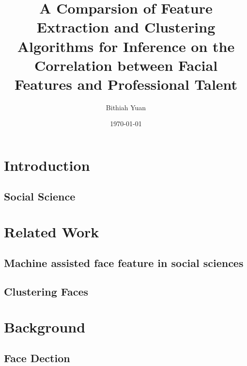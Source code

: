 \documentclass[12pt,english]{article}
\title{A Comparsion of Feature Extraction and Clustering Algorithms for Inference on the Correlation between Facial Features and Professional Talent}
\author{Bithiah Yuan}
\date{\today}
\begin{document}
\maketitle




\section{Introduction}
\label{sec:introduction}

\subsection{Social Science}

\quad %



\section{Related Work}


\subsection{Machine assisted face feature in social sciences}


\subsection{Clustering Faces}



\section{Background}
	

\subsection{Face Dection}
\end{document}

